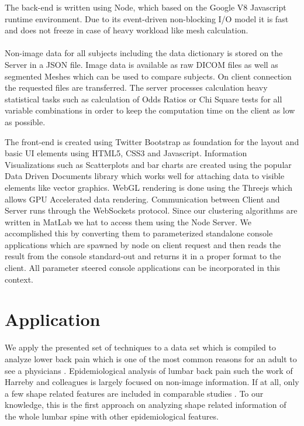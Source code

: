 \documentclass[journal]{style/vgtc} 			          %
\begin{document}
The back-end is written using Node, which based on the Google V8 Javascript runtime environment.
%
Due to its event-driven non-blocking I/O model it is fast and does not freeze in case of heavy workload like mesh calculation.
\\\\
Non-image data for all subjects including the data dictionary is stored on the Server in a JSON file.
%
Image data is available as raw DICOM files as well as segmented Meshes which can be used to compare subjects.
%
On client connection the requested files are transferred.
%
The server processes calculation heavy statistical tasks such as calculation of Odds Ratios or Chi Square tests for all variable combinations in order to keep the computation time on the client as low as possible.
%

The front-end is created using Twitter Bootstrap as foundation for the layout and basic UI elements using HTML5, CSS3 and Javascript.
%
Information Visualizations such as Scatterplots and bar charts are created using the popular Data Driven Documents library which works well for attaching data to visible elements like vector graphics.
%
WebGL rendering is done using the Threejs which allows GPU Accelerated data rendering.
%
Communication between Client and Server runs through the WebSockets protocol.
%
Since our clustering algorithms are written in MatLab we hat to access them using the Node Server.
%
We accomplished this by converting them to parameterized standalone console applications which are spawned by node on client request and then reads the result from the console standard-out and returns it in a proper format to the client.
%
All parameter steered console applications can be incorporated in this context.

\section{Application}
We apply the presented set of techniques to a data set which is compiled to analyze lower back pain which is one of the most common reasons for an adult to see a physicians \cite{Backpain}.
%
Epidemiological analysis of lumbar back pain such the work of Harreby and colleagues \cite{Harreby1996} is largely focused on non-image information.
%
If at all, only a few shape related features are included in comparable studies \cite{Lang2011}.
%
To our knowledge, this is the first approach on analyzing shape related information of the whole lumbar spine with other epidemiological features.
\end{document}
